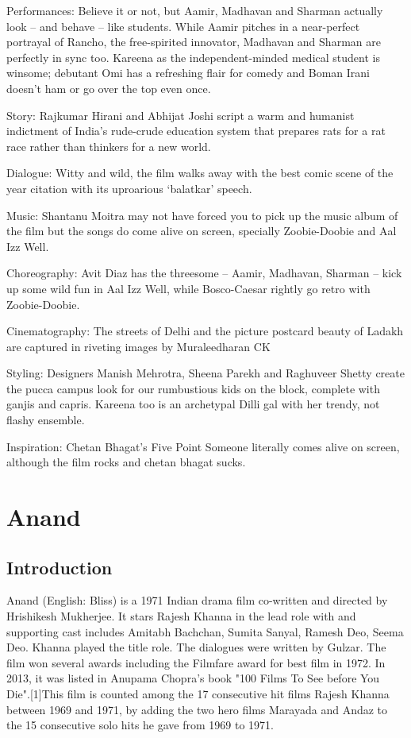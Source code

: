 \documentclass[11pt]{article}
\begin{document}
Performances: Believe it or not, but Aamir, Madhavan and Sharman actually look -- and behave -- like students. While Aamir pitches in a near-perfect portrayal of Rancho, the free-spirited innovator, Madhavan and Sharman are perfectly in sync too. Kareena as the independent-minded medical student is winsome; debutant Omi has a refreshing flair for comedy and Boman Irani doesn't ham or go over the top even once.

Story: Rajkumar Hirani and Abhijat Joshi script a warm and humanist indictment of India's rude-crude education system that prepares rats for a rat race rather than thinkers for a new world.

Dialogue: Witty and wild, the film walks away with the best comic scene of the year citation with its uproarious `balatkar' speech.

Music: Shantanu Moitra may not have forced you to pick up the music album of the film but the songs do come alive on screen, specially Zoobie-Doobie and Aal Izz Well.

Choreography: Avit Diaz has the threesome -- Aamir, Madhavan, Sharman -- kick up some wild fun in Aal Izz Well, while Bosco-Caesar rightly go retro with Zoobie-Doobie.

Cinematography: The streets of Delhi and the picture postcard beauty of Ladakh are captured in riveting images by Muraleedharan CK

Styling: Designers Manish Mehrotra, Sheena Parekh and Raghuveer Shetty create the pucca campus look for our rumbustious kids on the block, complete with ganjis and capris. Kareena too is an archetypal Dilli gal with her trendy, not flashy ensemble.

Inspiration: Chetan Bhagat's Five Point Someone literally comes alive on screen, although the film rocks and chetan bhagat sucks.


\section*{Anand}
\subsection*{Introduction}
Anand (English: Bliss) is a 1971 Indian drama film co-written and directed by Hrishikesh Mukherjee.
It stars Rajesh Khanna in the lead role with and supporting cast includes Amitabh Bachchan, Sumita Sanyal, 
Ramesh Deo, Seema Deo. Khanna played the title role. The dialogues were written by Gulzar. The film won 
several awards including the Filmfare award for best film in 1972. In 2013, it was listed in Anupama Chopra's
book "100 Films To See before You Die".[1]This film is counted among the 17 consecutive hit films Rajesh Khanna
between 1969 and 1971, by adding the two hero films Marayada and Andaz to the 15 consecutive solo hits he gave 
from 1969 to 1971.
\end{document}
